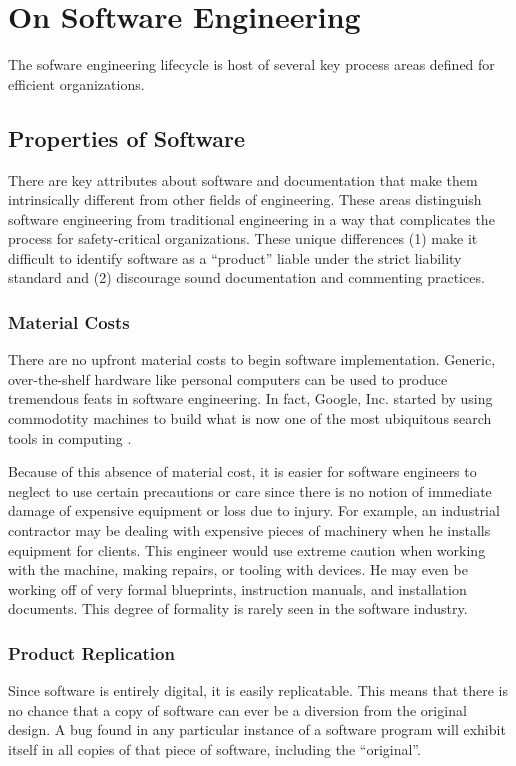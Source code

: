 \section{On Software Engineering}\label{sdp}
The sofware engineering lifecycle is host of several key process areas defined
for efficient organizations.

\subsection{Properties of Software}\label{software_props}
There are key attributes about software and documentation that make them 
intrinsically different from other fields of engineering. These areas 
distinguish software engineering from traditional engineering in a way that 
complicates the process for safety-critical organizations. These unique
differences (1) make it difficult to identify software as a ``product'' liable
under the strict liability standard and (2) discourage sound documentation and
commenting practices.

\subsubsection*{Material Costs}

There are no upfront material costs to begin software implementation. Generic,
over-the-shelf hardware like personal computers can be used to produce
tremendous feats in software engineering. In fact, Google, Inc. started by using
commodotity machines to build what is now one of the most ubiquitous search 
tools in computing \cite{Google}.

Because of this absence of material cost, it is easier for software engineers to
neglect to use certain precautions or care since there is no notion of immediate
damage of expensive equipment or loss due to injury. For example, an industrial
contractor may be dealing with expensive pieces of machinery when he installs
equipment for clients. This engineer would use extreme caution when working with
the machine, making repairs, or tooling with devices. He may even be working off
of very formal blueprints, instruction manuals, and installation documents. This
degree of formality is rarely seen in the software industry.

\subsubsection*{Product Replication}\label{software_product}
Since software is entirely digital, it is easily replicatable. This means that
there is no chance that a copy of software can ever be a diversion from the
original design. A bug found in any particular instance of a software program
will exhibit itself in all copies of that piece of software, including the
``original''.

